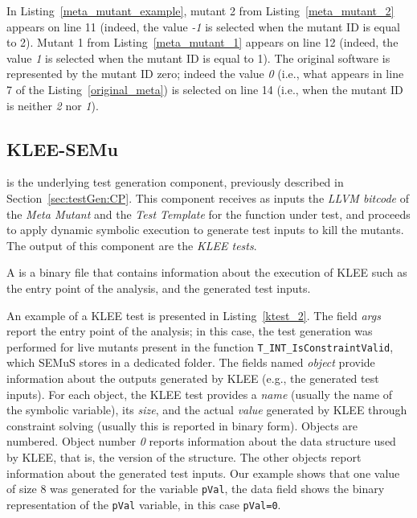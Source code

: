 In Listing~\ref{meta_mutant_example}, mutant 2 from Listing~\ref{meta_mutant_2} appears on line 11 (indeed, the value \emph{-1} is selected when the mutant ID is equal to 2). Mutant 1 from Listing~\ref{meta_mutant_1} appears on line 12 (indeed, the value \emph{1} is selected when the mutant ID is equal to 1). The original software is represented by the mutant ID zero; indeed the value \emph{0} (i.e., what appears in line 7 of the Listing~\ref{original_meta}) is selected on line 14 (i.e., when the mutant ID is neither \emph{2} nor \emph{1}).

\subsection{KLEE-SEMu}



 is the underlying test generation component, previously described in Section~\ref{sec:testGen:CP}. This component receives as inputs the \emph{LLVM bitcode} of the \emph{Meta Mutant} and the \emph{Test Template} for the function under test, and proceeds to apply dynamic symbolic execution to generate test inputs to kill the mutants. The output of this component are the \emph{KLEE tests}.

A  is a binary file that contains information about the execution of KLEE such as the entry point of the analysis, and the generated test inputs.


An example of a KLEE test is presented in Listing~\ref{ktest_2}. The field \emph{args} report the entry point of the analysis; in this case, the test generation was performed for live mutants present in the function \texttt{T\_INT\_Is\-Constraint\-Valid}, which SEMuS stores in a dedicated folder. The fields named \emph{object} provide information about the outputs generated by KLEE (e.g., the generated test inputs). 
For each object, the KLEE test provides a \emph{name} (usually the name of the symbolic variable), its \emph{size}, and the actual \emph{value} generated by KLEE through constraint solving (usually this is reported in binary form).
Objects are numbered. Object number \emph{0} reports information about the data structure used by KLEE, that is, the version of the structure. The other objects report information about the generated test inputs.
Our example shows that one value of size 8 was generated for the variable \texttt{pVal}, the data field shows the binary representation of the \texttt{pVal} variable, in this case \texttt{pVal=0}.


